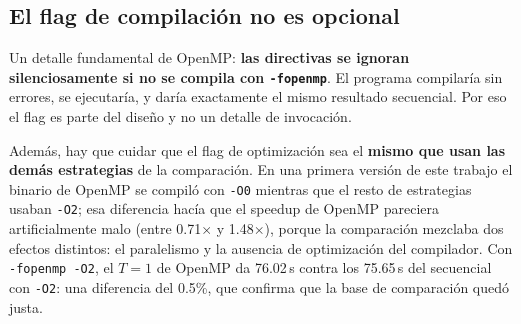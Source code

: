 \subsection{El flag de compilación no es opcional}

Un detalle fundamental de OpenMP: \textbf{las directivas se ignoran silenciosamente si no se compila con \texttt{-fopenmp}}. El programa compilaría sin errores, se ejecutaría, y daría exactamente el mismo resultado secuencial. Por eso el flag es parte del diseño y no un detalle de invocación.

Además, hay que cuidar que el flag de optimización sea el \textbf{mismo que usan las demás estrategias} de la comparación. En una primera versión de este trabajo el binario de OpenMP se compiló con \texttt{-O0} mientras que el resto de estrategias usaban \texttt{-O2}; esa diferencia hacía que el speedup de OpenMP pareciera artificialmente malo (entre 0.71$\times$ y 1.48$\times$), porque la comparación mezclaba dos efectos distintos: el paralelismo y la ausencia de optimización del compilador. Con \texttt{-fopenmp -O2}, el $T=1$ de OpenMP da 76.02\,s contra los 75.65\,s del secuencial con \texttt{-O2}: una diferencia del 0.5\%, que confirma que la base de comparación quedó justa.
